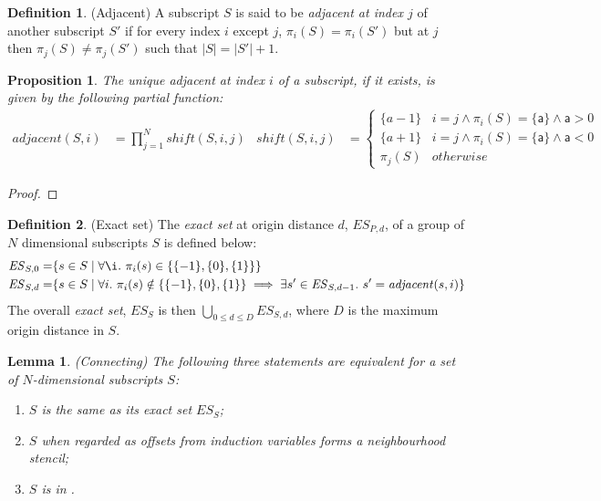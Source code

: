 \documentclass[acmlarge,review]{acmart}
\theoremstyle{definition}
\newtheorem{defn}{Definition}
\theoremstyle{plain}
\newtheorem{lem}{Lemma}
\newtheorem{prop}{Proposition}
\theoremstyle{remark}
\begin{document}
\begin{defn}{(Adjacent)}
  A subscript $S$ is said to be \emph{adjacent at index $j$} of another
  subscript $S'$ if for every index $i$ except $j$, $\pi_i(S) = \pi_i(S')$ but
  at $j$ then $\pi_j(S) \neq \pi_j(S')$ such that $|S| = |S'| + 1$.
\end{defn}
%
\begin{prop}
  The unique adjacent at index $i$ of a subscript, if it exists, is given by the
  following partial function:
%
  \begin{align*}
    \mathit{adjacent}(S,i) & = \prod^{N}_{j=1} \mathit{shift}(S,i,j) &
%
    \mathit{shift}(S,i,j) & =
      \begin{cases}
        \{a - 1\} & i = j \wedge \pi_i(S) = \{\mathsf{a}\} \wedge \mathsf{a} > 0\\
        \{a + 1\} & i = j \wedge \pi_i(S) = \{\mathsf{a}\} \wedge \mathsf{a} < 0\\
        \pi_j(S)  & otherwise
      \end{cases}
  \end{align*}
\end{prop}
%
\begin{proof}
\end{proof}

\begin{defn}{(Exact set)}
  The \emph{exact set} at origin distance $d$, $\mathit{ES}_{P,d}$, of a group
  of $N$ dimensional subscripts $S$ is defined below:
%
  \begin{align*}
    \mathit{ES}_{S,0} = &
      \{ s \in S \mid \forall \i.\ \pi_i(s) \in \{\{-1\}, \{0\}, \{1\}\} \} \\
    \mathit{ES}_{S,d} = &
      \{ s \in S \mid \forall i.\
      \pi_i(s) \notin \{\{-1\}, \{0\}, \{1\}\} \implies
      \exists s' \in \mathit{ES}_{S,d-1}.\ s' =
         \mathit{adjacent}(s,i) \}
  \end{align*}
%
  The overall \emph{exact set}, $\mathit{ES}_S$ is then
  $\bigcup_{0 \leq d \leq D} \mathit{ES}_{S,d}$, where $D$ is the maximum origin
  distance in $S$.
\end{defn}

\begin{lem}{(\emph{Connecting})}
  The following three statements are equivalent for a set of $N$-dimensional
  subscripts $S$:
%
  \begin{enumerate}
    \item $S$ is the same as its exact set $\mathit{ES}_S$;
    \item $S$ when regarded as offsets from induction variables forms a
      neighbourhood stencil;
    \item $S$ is in .
  \end{enumerate}
\end{lem}
\end{document}
